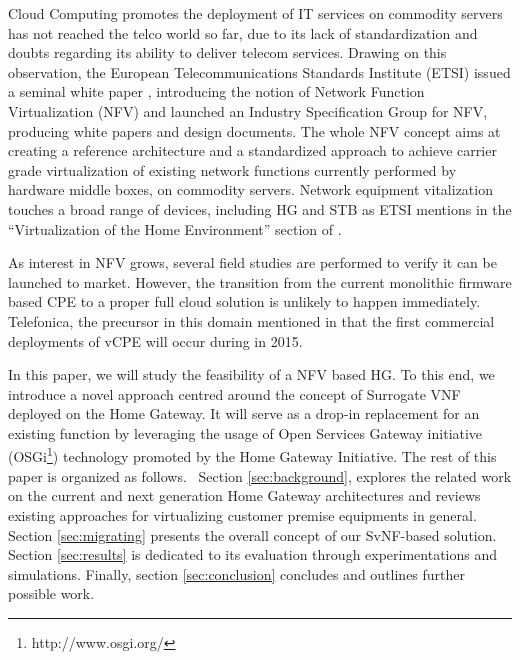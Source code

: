 Cloud Computing promotes the deployment of IT services on commodity servers has not reached the telco world so far, due to its lack of standardization and doubts regarding its ability to deliver telecom services. 
Drawing on this observation, the European Telecommunications Standards Institute (ETSI) issued a seminal white paper \cite{_network_2012}, introducing the notion of Network Function Virtualization (NFV) and launched an Industry Specification Group for NFV, producing white papers and design documents.
The whole NFV concept aims at creating a reference architecture and a standardized approach to achieve carrier grade virtualization of existing network functions currently performed by hardware middle boxes, on commodity servers.
Network equipment vitalization touches a broad range of devices, including HG and STB as ETSI mentions in the “Virtualization of the Home Environment” section of \cite{_network_2013}. 

As interest in NFV grows, several field studies are performed to verify it can be launched to market.
However, the transition from the current monolithic firmware based CPE to a proper full cloud solution is unlikely to happen immediately. Telefonica, the precursor in this domain mentioned in \cite{enrique_blanco_telefonica_2015} that the first commercial deployments of vCPE will occur during in 2015.

In this paper, we will study the feasibility of a NFV based HG.  To this end, we introduce a novel  approach centred around the concept of Surrogate VNF deployed on the Home Gateway.
It will serve as a drop-in replacement for an existing function by leveraging the usage of Open Services Gateway initiative (OSGi\footnote{http://www.osgi.org/}) technology promoted by the Home Gateway Initiative.
The rest of this paper is organized as follows.
~Section \ref{sec:background}, explores the related work on the current and next generation Home Gateway architectures and reviews existing approaches for virtualizing customer premise equipments in general.
Section \ref{sec:migrating} presents the overall concept of our SvNF-based solution. Section \ref{sec:results} is dedicated to its evaluation through experimentations and simulations. Finally, section \ref{sec:conclusion} concludes and outlines further possible work.


